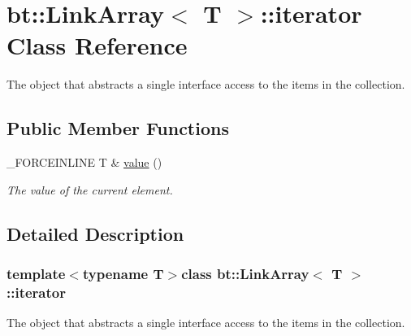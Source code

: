 \hypertarget{classbt_1_1_link_array_1_1iterator}{\section{bt\-:\-:Link\-Array$<$ T $>$\-:\-:iterator Class Reference}
\label{classbt_1_1_link_array_1_1iterator}
}


The object that abstracts a single interface access to the items in the collection.  


\subsection*{Public Member Functions}
\begin{DoxyCompactItemize}
\item 
\hypertarget{classbt_1_1_link_array_1_1iterator_a09cd1f4130f72e69109f75322067805a}{\-\_\-\-F\-O\-R\-C\-E\-I\-N\-L\-I\-N\-E T \& \hyperlink{classbt_1_1_link_array_1_1iterator_a09cd1f4130f72e69109f75322067805a}{value} ()}\label{classbt_1_1_link_array_1_1iterator_a09cd1f4130f72e69109f75322067805a}

\begin{DoxyCompactList}\small\item\em The value of the current element. \end{DoxyCompactList}\end{DoxyCompactItemize}


\subsection{Detailed Description}
\subsubsection*{template$<$typename T$>$class bt\-::\-Link\-Array$<$ T $>$\-::iterator}

The object that abstracts a single interface access to the items in the collection. 